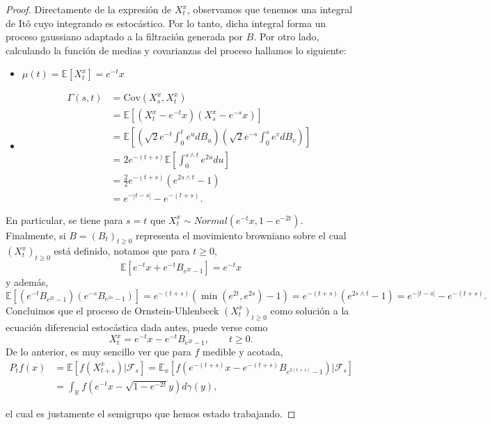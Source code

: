 \documentclass[letterpaper,twoside,12pt]{book}
\newcommand{\R}{\mathbb{R}}
\newcommand{\F}{\mathcal{F}}
\newcommand{\E}{\mathbb{E}}
\newcommand{\1}{\mathds{1}}
\theoremstyle{definition}
\theoremstyle{definition}
\theoremstyle{remark}
\theoremstyle{definition}
\theoremstyle{definition}
\theoremstyle{definition}
\theoremstyle{definition}
\theoremstyle{definition}
\begin{document}
\begin{proof}
     Directamente de la expresión de $X_t^{x}$, observamos que tenemos una integral de Itô cuyo integrando es estocástico. Por lo tanto, dicha integral forma un proceso gaussiano adaptado a la filtración generada por $B$. Por otro lado, calculando la función de medias y covarianzas del proceso hallamos lo siguiente:
     \begin{itemize}
        \item $\mu(t)=\E\left[X_t^{x}\right]=e^{-t}x$
        \item \begin{align*}\Gamma(s,t)&=\text{Cov}\left(X_s^x,X_t^x\right)\\
            &=\E\left[\left(X_t^{x}-e^{-t}x\right)\left(X_s^x-e^{-s}x\right)\right]\\
            &=\E\left[\left(\sqrt{2}e^{-t}\int_{0}^{t}e^{u}dB_u\right)\left(\sqrt{2}e^{-s}\int_{0}^{s}e^{v}dB_v\right)\right]\\
            &=2e^{-(t+s)}\E\left[\int_{0}^{s\wedge t}e^{2u}du\right]\\
            &=\frac{2}{2}e^{-(t+s)}(e^{2s\wedge t}-1)\\
            &=e^{-|t-s|}-e^{-(t+s)}.
        \end{align*}
     \end{itemize}
     En particular, se tiene para $s=t$ que $X_t^x\sim Normal(e^{-t}x,1-e^{-2t})$. Finalmente, si $B=(B_t)_{t\geq0}$ representa el movimiento browniano sobre el cual $(X_t^x)_{t\geq0}$ está definido, notamos que para $t\geq0$,
     \[
     \E\left[e^{-t}x+e^{-t}B_{e^{2t}-1}\right]=e^{-t}x
     \]
     y además, 
     \[
     \E\left[\left(e^{-t}B_{e^{2t}-1}\right) \left(e^{-s}B_{e^{2s}-1}\right)\right]=e^{-(t+s)}(\min(e^{2t},e^{2s})-1)=e^{-(t+s)}(e^{2s\wedge t}-1)=e^{-|t-s|}-e^{-(t+s)}.
     \]
     Concluimos que el proceso de Ornstein-Uhlenbeck $(X_t^{x})_{t\geq0}$ como solución a la ecuación diferencial estocástica dada antes, puede verse como 
     \[
        X_t^{x}=e^{-t}x-e^{-t}B_{e^{2t}-1}, \qquad t\geq0.
     \]
     De lo anterior, es muy sencillo ver que para $f$ medible y acotada, 
     \begin{align*}
      P_tf(x)&=\E\left[f(X_{t+s}^{x})|\F_s\right]=\E_x\left[f(e^{-(t+s)}x-e^{-(t+s)}B_{e^{2(t+s)}-1})|\F_s\right]\\
      &=\int_\R f \left(e^{-t}x-\sqrt{1-e^{-2t}}y\right)d\gamma(y),
     \end{align*}
     
     el cual es justamente el semigrupo que hemos estado trabajando.
   \end{proof}
\end{document}
